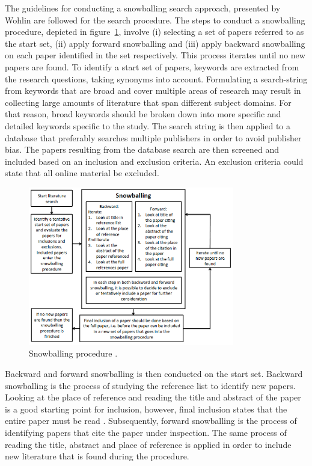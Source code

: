 The guidelines for conducting a snowballing search approach, presented by Wohlin \cite{Wohlin} are followed for the search procedure. The steps to conduct a snowballing procedure, depicted in figure~\ref{snow}, involve (i) selecting a set of papers referred to as the start set, (ii) apply forward snowballing and (iii) apply backward snowballing on each paper identified in the set respectively. This process iterates until no new papers are found. To identify a start set of papers, keywords are extracted from the research questions, taking synonyms into account. Formulating a search-string from keywords that are broad and cover multiple areas of research may result in collecting large amounts of literature that span different subject domains. For that reason, broad keywords should be broken down into more specific and detailed keywords specific to the study. The search string is then applied to a database that preferably searches multiple publishers in order to avoid publisher bias. The papers resulting from the database search are then screened and included based on an inclusion and exclusion criteria. An exclusion criteria could state that all online material be excluded. \\

\begin{figure}[ht]
\centering
     \includegraphics[width=0.8\textwidth]{./figure/snowballing.png}
      \caption{Snowballing procedure \cite{Wohlin}.}
       \label{snow}
\end{figure}

Backward and forward snowballing is then conducted on the start set. Backward snowballing is the process of studying the reference list to identify new papers. Looking at the place of reference and reading the title and abstract of the paper is a good starting point for inclusion, however, final inclusion states that the entire paper must be read \cite{Wohlin}. Subsequently, forward snowballing is the process of identifying papers that cite the paper under inspection. The same process of reading the title, abstract and place of reference is applied in order to include new literature that is found during the procedure. \\

